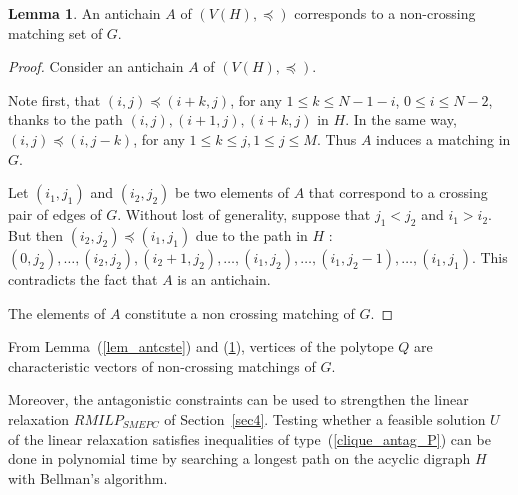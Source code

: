 \documentclass[11pt]{article}
\theoremstyle{plain}%
\theoremstyle{definition} \newtheorem{lem}{Lemma}[section]
\theoremstyle{definition} \newtheorem{claim}{Claim}[lem]
\theoremstyle{definition} \newtheorem{theorem}{Theorem}[section]
\theoremstyle{definition} \newtheorem{exo}{Exercice n$^\circ$}
\theoremstyle{definition} \newtheorem{quest}{}[exo]
\theoremstyle{definition} \newtheorem{sousquest}{}[quest]
\theoremstyle{remark}
\theoremstyle{definition}
\begin{document}
\begin{lem}\label{lem_antichMatch}
An antichain $A$ of $(V(H),\preceq)$ corresponds to a non-crossing matching set of $G$.
\end{lem}
\begin{proof}
Consider an antichain $A$ of $(V(H),\preceq)$.

Note first, that $(i,j) \preceq (i+k,j)$, for any $1 \le k \le N-1-i$, $0 \le i\le N-2$, thanks to the path $(i,j), (i+1,j), (i+k,j)$ in $H$. In the same way, $(i,j) \preceq (i,j-k)$, for any $1 \le k \le j, 1\le j \le M$. Thus $A$ induces a matching in $G$.

 Let $(i_1,j_1)$ and $(i_2,j_2)$ be two elements of $A$ that correspond to a crossing pair of edges of $G$. Without lost of generality, suppose that $j_1<j_2$ and $i_1 >i_2$. But then $(i_2,j_2)\preceq (i_1,j_1)$ due to the path in $H$ : $(0,j_2),\dots,(i_2,j_2), (i_2+1,j_2), \dots, (i_1,j_2), \dots, (i_1,j_2-1), \dots,(i_1,j_1) $. This contradicts the fact that $A$ is an antichain. 

The elements of $A$ constitute a non crossing matching of $G$.
\end{proof}

From Lemma~(\ref{lem_antcste}) and (\ref{lem_antichMatch}), vertices of the polytope $Q$ are characteristic vectors of non-crossing matchings of $G$.

Moreover, the antagonistic constraints can be used to strengthen the linear relaxation $RMILP_{SMEPC}$ of Section~\ref{sec4}.
Testing whether a feasible solution $U$ of the linear 
relaxation satisfies inequalities of type~(\ref{clique_antag_P}) can be done in polynomial time
by searching a longest path on the acyclic digraph $H$ with Bellman's algorithm.
\end{document}
